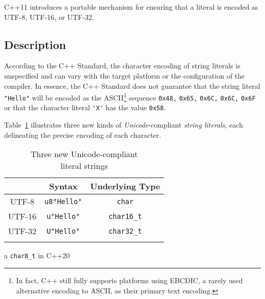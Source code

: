 


\setcounter{table}{0}
\setcounter{footnote}{0}
\setcounter{lstlisting}{0}

C++11 introduces a portable mechanism for ensuring that a literal is
encoded as UTF-8, UTF-16, or UTF-32.

\subsection[Description]{Description}\label{description-unicodestring}

According to the C++ Standard, the character encoding of string literals
is unspecified and can vary with the target platform or the configuration of
the compiler. In essence, the C++ Standard does not guarantee that the
string literal \lstinline!"Hello"! will be encoded as the
ASCII{\cprotect\footnote{In fact, C++ still fully supports platforms
  using EBCDIC, a rarely used alternative encoding to ASCII, as their primary text encoding.}} sequence
\lstinline!0x48,! \lstinline!0x65,! \lstinline!0x6C,! \lstinline!0x6C,! \lstinline!0x6F!
or that the character literal \lstinline!'X'! has the value
\lstinline!0x58!.

Table~\ref{unicodestring-table1} illustrates three new kinds of \emph{Unicode}-compliant
\emph{string literals}, each delineating the precise encoding of each
character.
 \begin{table}[h!]
\begin{center}
\begin{threeparttable}
\caption{Three new Unicode-compliant\\ literal strings}\label{unicodestring-table1}\vspace{1.5ex}
{\small \begin{tabular}{c|c|c}\thickhline
\rowcolor[gray]{.9}{\sffamily\bfseries Encoding} & {\sffamily\bfseries Syntax} & {\sffamily\bfseries Underlying Type}\\ \hline
UTF-8   &  \lstinline!u8"Hello"! & \lstinline!char!\tnote{a}\\ \hline
UTF-16 & \lstinline!u"Hello"!  & \lstinline!char16_t! \\ \hline
UTF-32  & \lstinline!U"Hello"! & \lstinline!char32_t!\\ \thickhline
\end{tabular}
} %
\begin{tablenotes}{\footnotesize
\item[a]{\lstinline!char8_t! in C++20}
}
\end{tablenotes}
\end{threeparttable}
\end{center} 
\end{table} 

